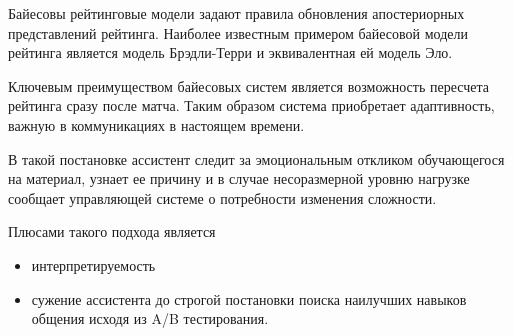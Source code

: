 Байесовы рейтинговые модели задают правила обновления апостериорных представлений рейтинга. Наиболее известным примером байесовой модели рейтинга является модель Брэдли-Терри и эквивалентная ей модель Эло.

Ключевым преимуществом байесовых систем является возможность пересчета рейтинга сразу после матча. Таким образом система приобретает адаптивность, важную в коммуникациях в настоящем времени.






В такой постановке ассистент следит за эмоциональным откликом обучающегося на материал,
узнает ее причину и в случае несоразмерной уровню нагрузке сообщает управляющей системе о потребности изменения сложности.

Плюсами такого подхода является \begin{itemize}
    \item интерпретируемость
    \item сужение ассистента до строгой постановки поиска наилучших навыков общения исходя из A/B тестирования.
\end{itemize}



